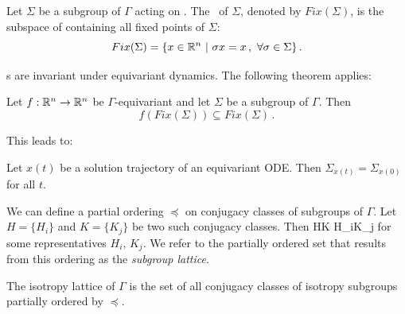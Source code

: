 \begin{definition}
 \label{def:fixedsp}
  Let $\Sigma$ be a subgroup of $\Gamma$ acting on . The \fixedsp\ of $\Sigma$,
 denoted by $Fix(\Sigma)$, is the subspace of  containing all fixed points of $\Sigma$:
\[
	Fix(\Sigma)=\{x\in\mathbb{R}^{n}\ |\ \sigma x = x\,,\ \forall \sigma\in\Sigma\}\,.
\]
\end{definition}

\Fixedsp s are invariant under equivariant dynamics. The following theorem applies:

\begin{theorem}
 Let $f:\mathbb{R}^{n}\rightarrow\mathbb{R}^{n}$ be $\Gamma$-equivariant and let $\Sigma$ be a subgroup of $\Gamma$. Then
\[
 f\left(Fix(\Sigma)\right)\subseteq Fix(\Sigma)\,.
\]
\end{theorem}

This leads to:
\begin{proposition}
 Let $x(t)$ be a solution trajectory of an equivariant ODE. Then $\Sigma_{x(t)}=\Sigma_{x(0)}$ for all $t$.
\label{pro:gfInv}
\end{proposition}

We can define a partial ordering $\preceq$ on conjugacy classes of subgroups of $\Gamma$. Let $H=\{H_i\}$ and $K=\{K_j\}$
be two such conjugacy classes. Then
\beq
	H\preceq K \Leftrightarrow H_i\subseteq K_j
	\label{eq:Gorder}
\eeq
for some representatives $H_i,\,K_j$. We refer to the partially ordered set that results from this ordering as the \emph{subgroup lattice}.

\begin{definition}
 The isotropy lattice of $\Gamma$ is the set of all conjugacy classes of isotropy subgroups
 partially ordered by $\preceq$.
\end{definition}


